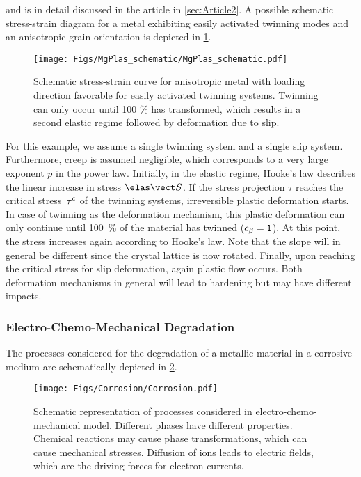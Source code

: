 and is in detail discussed in the article in \cref{sec:Article2}. A possible schematic stress-strain diagram for a metal exhibiting easily activated twinning modes and an anisotropic grain orientation is depicted in \cref{fig:MgPlas}.
\begin{figure}[h!]
  \centering
  \texttt{[image: Figs/MgPlas\_schematic/MgPlas\_schematic.pdf]}
  \caption{Schematic stress-strain curve for anisotropic metal with loading direction favorable for easily activated twinning systems. Twinning can only occur until 100 \% has transformed, which results in a second elastic regime followed by deformation due to slip. }
  \label{fig:MgPlas}
\end{figure}

For this example, we assume a single twinning system and a single slip system. Furthermore, creep is assumed negligible, which corresponds to a very large exponent $p$ in the power law. Initially, in the elastic regime, Hooke's law describes the linear increase in stress $\SSe$. If the stress projection $\tau$ reaches the critical stress~$\tau^{\rm c}$ of the twinning systems, irreversible plastic deformation starts. In case of twinning as the deformation mechanism, this plastic deformation can only continue until 100~\% of the material has twinned (\mbox{$c_{\beta}=1$}). At this point, the stress increases again according to Hooke's law. Note that the slope will in general be different since the crystal lattice is now rotated. Finally, upon reaching the critical stress for slip deformation, again plastic flow occurs. Both deformation mechanisms in general will lead to hardening but may have different impacts.

\subsubsection{Electro-Chemo-Mechanical Degradation}
The processes considered for the degradation of a metallic material in a corrosive medium are schematically depicted in \cref{fig:Corrosion}.
\begin{figure}[h!]
  \centering
  \texttt{[image: Figs/Corrosion/Corrosion.pdf]}
  \caption{Schematic representation of processes considered in electro-chemo-mechanical model. Different phases have different properties. Chemical reactions may cause phase transformations, which can cause mechanical stresses. Diffusion of ions leads to electric fields, which are the driving forces for electron currents.}
  \label{fig:Corrosion}
\end{figure}

